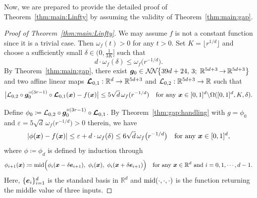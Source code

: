 \documentclass[nohyperref]{article}
\theoremstyle{plain}
\theoremstyle{definition}
\theoremstyle{remark}
\begin{document}
Now, we are prepared to provide the detailed proof of Theorem~\ref{thm:main:Linfty} by assuming the validity of Theorem~\ref{thm:main:gap}.
\begin{proof}[Proof of Theorem~\ref{thm:main:Linfty}]	
	We may assume $f$ is not a constant function since it is  a trivial case. Then $\omega_f(t)>0$ for any $t>0$. 
	Set $K=\lfloor r^{1/d}\rfloor$ and choose a sufficiently small $\delta\in(0,\tfrac{1}{3K}]$ such that 
	\begin{equation*}
		d\cdot \omega_f(\delta)\le \omega_f\big(r^{-1/d}\big).
	\end{equation*}	
	By Theorem~\ref{thm:main:gap}, 		there exist $\bmg_0\in \nn[\big]{39d+24}{3}{5d+3}{5d+3}$
and two affine linear maps
$\bmcalL_{0,1}:\R^d\to\R^{5d+3}$ and $\calL_{0,2}:\R^{5d+3}\to\R$
such that 
\begin{equation*}
	\big|{\mathcal{L}}_{0,2}\circ {\bm{g}}_0^{\circ (3r-1)}\circ {\bm{\mathcal{L}}}_{0,1}({\bm{x}})-f({\bm{x}})\big|\le 5\sqrt{d}\,\omega_f(r^{-1/d})\quad \textnormal{for any ${\bm{x}}\in [0,1]^d\backslash\Omega([0,1]^d,K,\delta)$}.
\end{equation*}

Define $\phi_0\coloneqq {\mathcal{L}}_{0,2}\circ {\bm{g}}_0^{\circ (3r-1)}\circ {\bm{\mathcal{L}}}_{0,1}$. 
	By Theorem~\ref{thm:gap:handling}  with $g=\phi_0$ and $\varepsilon=5\sqrt{d}\,\omega_f\big(r^{-1/d}\big)>0$ therein, we have
	\begin{equation}\label{eq:phi-f:all:x}
		|\phi({\bm{x}})-f({\bm{x}})|\le \varepsilon+d\cdot \omega_f(\delta)\le  6\sqrt{d}\,\omega_f\big(r^{-1/d}\big)\quad \textnormal{for any ${\bm{x}}\in [0,1]^d$},
	\end{equation}
	where $\phi\coloneqq  \phi_d$ is defined by induction through 
	\begin{equation*}
		\phi_{i+1}(\bmx)\coloneqq  \middleValue\Big(\phi_{i}(\bmx-\delta\bme_{i+1}),  \  \phi_{i}(\bmx),
	\   \phi_{i}(\bmx+\delta\bme_{i+1})\Big)\quad \tn{for any $\bmx\in \R^d$ and $i=0,1,\dotsc,d-1$.}
	\end{equation*}
	Here, $\{{\bm{e}}_i\}_{i=1}^d$ is the standard basis in $\mathbb{R}^d$ and ${\textnormal{mid}}(\cdot,\cdot,\cdot)$ is the function returning the middle value of three inputs. 


\end{proof}
\end{document}
